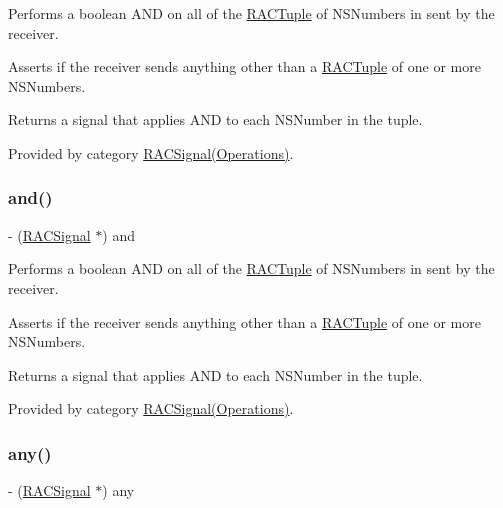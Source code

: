 Performs a boolean A\+ND on all of the \mbox{\hyperlink{interface_r_a_c_tuple}{R\+A\+C\+Tuple}} of N\+S\+Numbers in sent by the receiver.

Asserts if the receiver sends anything other than a \mbox{\hyperlink{interface_r_a_c_tuple}{R\+A\+C\+Tuple}} of one or more N\+S\+Numbers.

Returns a signal that applies A\+ND to each N\+S\+Number in the tuple. 

Provided by category \mbox{\hyperlink{category_r_a_c_signal_07_operations_08_a4a12f1ef58487260894d1ef37dbb9c9d}{R\+A\+C\+Signal(\+Operations)}}.

\mbox{\label{interface_r_a_c_signal_a4a12f1ef58487260894d1ef37dbb9c9d}} 
\subsubsection{\texorpdfstring{and()}{and()}\hspace{0.1cm}{\footnotesize\ttfamily [3/3]}}
{\footnotesize\ttfamily -\/ (\mbox{\hyperlink{interface_r_a_c_signal}{R\+A\+C\+Signal}} $\ast$) and \begin{DoxyParamCaption}{ }\end{DoxyParamCaption}}

Performs a boolean A\+ND on all of the \mbox{\hyperlink{interface_r_a_c_tuple}{R\+A\+C\+Tuple}} of N\+S\+Numbers in sent by the receiver.

Asserts if the receiver sends anything other than a \mbox{\hyperlink{interface_r_a_c_tuple}{R\+A\+C\+Tuple}} of one or more N\+S\+Numbers.

Returns a signal that applies A\+ND to each N\+S\+Number in the tuple. 

Provided by category \mbox{\hyperlink{category_r_a_c_signal_07_operations_08_a4a12f1ef58487260894d1ef37dbb9c9d}{R\+A\+C\+Signal(\+Operations)}}.

\mbox{\label{interface_r_a_c_signal_af64359cf92ab95039f48270a71446e08}} 
\subsubsection{\texorpdfstring{any()}{any()}\hspace{0.1cm}{\footnotesize\ttfamily [1/3]}}
{\footnotesize\ttfamily -\/ (\mbox{\hyperlink{interface_r_a_c_signal}{R\+A\+C\+Signal}} $\ast$) any \begin{DoxyParamCaption}{ }\end{DoxyParamCaption}}

